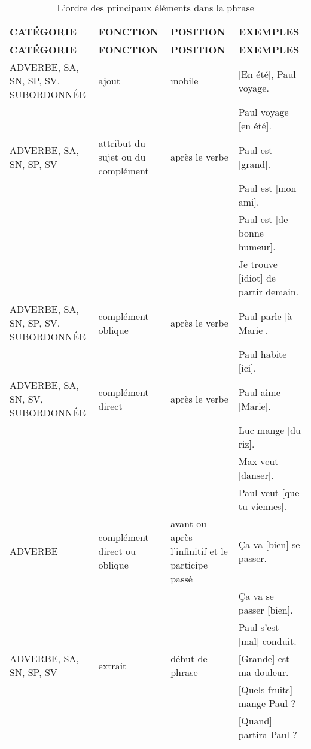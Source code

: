 \documentclass[UTF8]{report}
\begin{document}
  
\begin{longtable}{|p{3.5cm}|p{3.5cm}|p{3.5cm}|p{5cm}|}
    \caption{L’ordre des principaux éléments dans la phrase}
    \rowcolor{cyan!20}
    \hline
    \textbf{CATÉGORIE} & \textbf{FONCTION} & \textbf{POSITION} & \textbf{EXEMPLES} \\
    \hline
    \endfirsthead %

    \hline
    \rowcolor{cyan!20}
    \textbf{CATÉGORIE} & \textbf{FONCTION} & \textbf{POSITION} & \textbf{EXEMPLES} \\
    \hline
    \endhead %

    \hline
    \endfoot %

    \hline
    \endlastfoot %

    ADVERBE, SA, SN, SP, SV, SUBORDONNÉE & ajout & mobile & [En été], Paul voyage. \\
    & & & Paul voyage [en été]. \\
    \hline
    ADVERBE, SA, SN, SP, SV & attribut du sujet ou du complément & après le verbe & Paul est [grand]. \\
    & & & Paul est [mon ami]. \\
    & & & Paul est [de bonne humeur]. \\
    & & & Je trouve [idiot] de partir demain. \\
    \hline
    ADVERBE, SA, SN, SP, SV, SUBORDONNÉE & complément oblique & après le verbe & Paul parle [à Marie]. \\
    & & & Paul habite [ici]. \\
    \hline
    ADVERBE, SA, SN, SV, SUBORDONNÉE & complément direct & après le verbe & Paul aime [Marie]. \\
    & & & Luc mange [du riz]. \\
    & & & Max veut [danser]. \\
    & & & Paul veut [que tu viennes]. \\
    \hline
    ADVERBE & complément direct ou oblique & avant ou après l'infinitif et le participe passé & Ça va [bien] se passer. \\
    & & & Ça va se passer [bien]. \\
    & & & Paul s'est [mal] conduit. \\
    \hline
    ADVERBE, SA, SN, SP, SV & extrait & début de phrase & [Grande] est ma douleur. \\
    & & & [Quels fruits] mange Paul ? \\
    & & & [Quand] partira Paul ? \\

\end{longtable}
\end{document}
